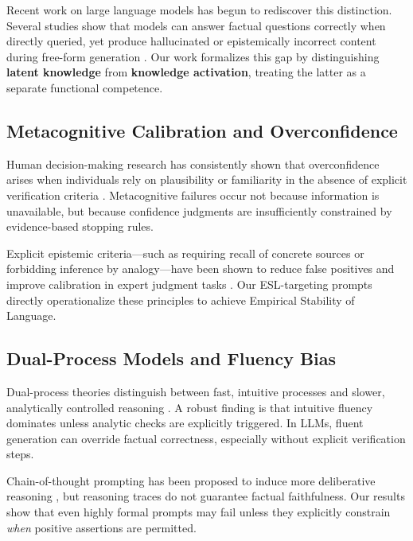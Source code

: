 \documentclass[11pt,a4paper]{article}
\begin{document}
Recent work on large language models has begun to rediscover this distinction. Several studies show that models can answer factual questions correctly when directly queried, yet produce hallucinated or epistemically incorrect content during free-form generation \citep{ji2023survey, manakul2023selfcheckgpt}. Our work formalizes this gap by distinguishing \textbf{latent knowledge} from \textbf{knowledge activation}, treating the latter as a separate functional competence.

\subsection{Metacognitive Calibration and Overconfidence}

Human decision-making research has consistently shown that overconfidence arises when individuals rely on plausibility or familiarity in the absence of explicit verification criteria \citep{fischhoff1977knowing, rozenblit2002misunderstood}. Metacognitive failures occur not because information is unavailable, but because confidence judgments are insufficiently constrained by evidence-based stopping rules.

Explicit epistemic criteria---such as requiring recall of concrete sources or forbidding inference by analogy---have been shown to reduce false positives and improve calibration in expert judgment tasks \citep{kahneman2021noise}. Our ESL-targeting prompts directly operationalize these principles to achieve Empirical Stability of Language.

\subsection{Dual-Process Models and Fluency Bias}

Dual-process theories distinguish between fast, intuitive processes and slower, analytically controlled reasoning \citep{evans2013dual, kahneman2011thinking}. A robust finding is that intuitive fluency dominates unless analytic checks are explicitly triggered. In LLMs, fluent generation can override factual correctness, especially without explicit verification steps.

Chain-of-thought prompting has been proposed to induce more deliberative reasoning \citep{wei2022chain}, but reasoning traces do not guarantee factual faithfulness. Our results show that even highly formal prompts may fail unless they explicitly constrain \emph{when} positive assertions are permitted.
\end{document}
